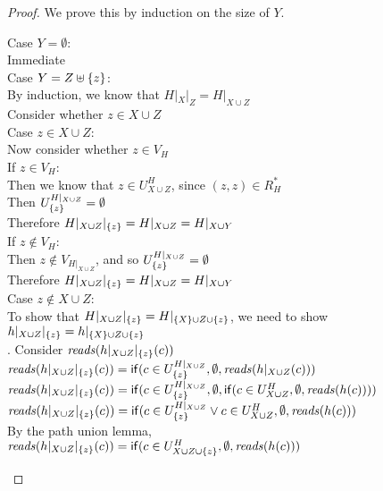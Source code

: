 \begin{proof}
We prove this by induction on the size of $Y$. 
\begin{tabbedproof}
\oo Case $Y = \emptyset$: \\
\ooo Immediate \\
\oo Case $Y = Z \uplus \{{z}\}$: \\
\ooo By induction, we know that $H|_X|_Z = H|_{X \cup Z}$ \\
\ooo Consider whether $z \in X \cup Z$ \\
\ooo Case $z \in X \cup Z$: \\
\oooo Now consider whether $z \in V_H$ \\
\oooo If $z \in V_H$:\\
\ooooo Then we know that $z \in U^H_{X \cup Z}$, since $(z, z) \in R^\ast_H$ \\
\ooooo Then $U^{H|_{X \cup Z}}_{\{{z}\}} = \emptyset$ \\
\ooooo Therefore $H|_{X \cup Z}|_{\{{z}\}} = H|_{X \cup Z} = H|_{X \cup Y}$  \\ 
\oooo If $z \not\in V_H$: \\
\ooooo Then $z \not\in V_{H|_{X \cup Z}}$, and so $U^{H|_{X \cup Z}}_{\{{z}\}} = \emptyset$ \\
\ooooo Therefore $H|_{X \cup Z}|_{\{{z}\}} = H|_{X \cup Z} = H|_{X \cup Y}$  \\ 
\ooo Case $z \not\in X \cup Z$: \\
\oooo To show that $H|_{X \cup Z}|_{\{{z}\}} = H|_{\{{X}\} \cup Z \cup \{{z}\}} $, we need to show $h|_{X \cup Z}|_{\{{z}\}} = h|_{\{{X}\} \cup Z \cup \{{z}\}}$ \\
. Consider $\mathit{reads}(h|_{X \cup Z}|_{\{{z}\}}(c))$ \\
\ooooo $\mathit{reads}(h|_{X \cup Z}|_{\{{z}\}}(c)) = \mathsf{if}({c \in U^{H|_{X \cup Z}}_{\{{z}\}}}, {\emptyset}, {\mathit{reads}(h|_{X \cup Z}(c))})$ \\
\ooooo $\mathit{reads}(h|_{X \cup Z}|_{\{{z}\}}(c)) = \mathsf{if}({c \in U^{H|_{X \cup Z}}_{\{{z}\}}}, {\emptyset}, {\mathsf{if}({c \in U^H_{X \cup Z}}, {\emptyset}, {\mathit{reads}(h(c))})})$ \\
\ooooo $\mathit{reads}(h|_{X \cup Z}|_{\{{z}\}}(c)) = \mathsf{if}({c \in U^{H|_{X \cup Z}}_{\{{z}\}} \vee c \in U^H_{X \cup Z}}, {\emptyset}, {\mathit{reads}(h(c))})$ \\
\ooooo By the path union lemma, \\
\ooooox $\mathit{reads}(h|_{X \cup Z}|_{\{{z}\}}(c)) = \mathsf{if}({c \in U^H_{X \cup Z \cup \{{z}\}}}, {\emptyset}, {\mathit{reads}(h(c))})$ \\

\end{tabbedproof}
\end{proof}
